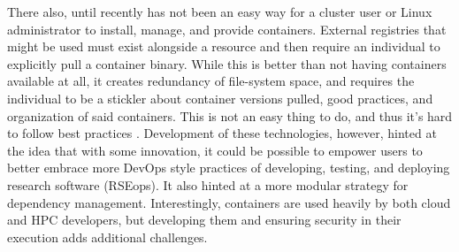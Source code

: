 There also, until recently \cite{shpc} has not been an easy way for a cluster user or Linux administrator to install, manage, and provide containers. External registries that might be used \cite{sregistry,distribution-spec} must exist alongside a resource and then require an individual to explicitly pull a container binary. While this is better than not having containers available at all, it creates redundancy of file-system space, and requires the individual to be a stickler about container versions pulled, good practices, and organization of said containers. This is not an easy thing to do, and thus it's hard to follow best practices \cite{ten-simple-rules}. Development of these technologies, however, hinted at the idea that with some innovation, it could be possible to empower users to better embrace more DevOps style practices of developing, testing, and deploying research software (RSE\-ops). It also hinted at a more modular strategy for dependency management. Interestingly, containers are used heavily by both cloud and HPC developers, but developing them and ensuring security in their execution adds additional challenges.
